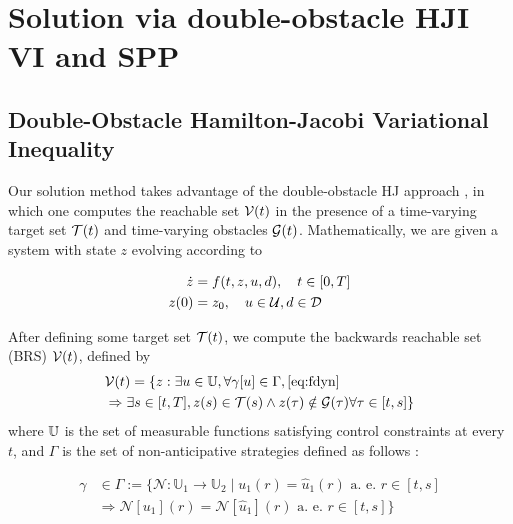 \section{Solution via double-obstacle HJI VI and SPP\label{sec:solution}}
\subsection{Double-Obstacle Hamilton-Jacobi Variational Inequality}
Our solution method takes advantage of the double-obstacle HJ approach \cite{Fisac15}, in which one computes the reachable set $\mathcal{V}(t)$ in the presence of a time-varying target set $\mathcal{T}(t)$ and time-varying obstacles $\mathcal{G}(t)$. Mathematically, we are given a system with state $z$ evolving according to

\begin{equation}
\label{eq:fdyn} %
\begin{aligned}
\dot{z} &= f(t, z, u, d), \quad t \in [0, T] \\
z(0) &= z_0, \quad u \in \cset, d \in \dset
\end{aligned}
\end{equation}

After defining some target set $\mathcal{T}(t)$, we compute the backwards reachable set (BRS) $\mathcal{V}(t)$, defined by
%
\begin{equation}
\label{eq:brs}
\begin{aligned}
&\mathcal{V}(t) = \{z: \exists u \in \mathbb{U}, \forall \gamma[u] \in \Gamma, \eqref{eq:fdyn} \\
&\Rightarrow \exists s \in [t, T], z(s) \in \mathcal{T}(s) \wedge z(\tau) \notin \mathcal{G}(\tau) \forall \tau \in [t, s]\}
\end{aligned}
\end{equation}
%
\noindent where $\mathbb{U}$ is the set of measurable functions satisfying control constraints at every $t$, and $\Gamma$ is the set of non-anticipative strategies \cite{Mitchell05} defined as follows :

\begin{equation}
\begin{aligned}
\gamma &\in \Gamma := \{\mathcal{N}: \mathbb{U}_1 \rightarrow \mathbb{U}_2 \mid  u_1(r) = \hat{u}_1(r) \text{ a. e. } r\in[t,s] \\
& \Rightarrow \mathcal{N}[u_1](r) = \mathcal{N}[\hat{u}_1](r) \text{ a. e. } r\in[t,s]\}
\end{aligned}
\end{equation}

